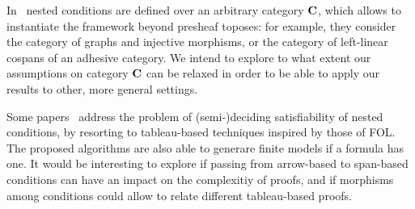 In~\cite{bchk:conditional-reactive-systems,sksclo:coinductive-techniques-for-satisfiability} nested conditions are defined over an arbitrary category $\mathbf{C}$, which allows to instantiate the framework beyond presheaf toposes: for example, they consider the category of graphs and injective morphisms, or the category of left-linear cospans of an adhesive category. We intend to explore to what extent our assumptions on category $\mathbf{C}$ can be relaxed in order to be able to apply our results to other, more general settings.

Some papers~\cite{lo:tableau-graph-properties,slo:model-generation,sksclo:coinductive-techniques-for-satisfiability} address the problem of (semi-)deciding satisfiability of nested conditions, by resorting to tableau-based techniques inspired by those of FOL. The proposed algorithms are also able to generare finite models if a formula has one.
It would be interesting to explore if passing from arrow-based to span-based conditions can have an impact on the complexitiy of proofs, and if morphisms among conditions could allow to relate different tableau-based proofs.
